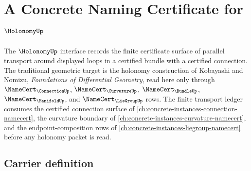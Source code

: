\chapter{A Concrete Naming Certificate for $\HolonomyUp$}
\label{ch:concrete-instances-holonomy-namecert}

The $\HolonomyUp$ interface records the finite certificate surface of parallel transport around displayed loops in a certified bundle with a certified connection. The traditional geometric target is the holonomy construction of Kobayashi and Nomizu, \emph{Foundations of Differential Geometry}, read here only through $\NameCert_{\ConnectionUp}$, $\NameCert_{\CurvatureUp}$, $\NameCert_{\BundleUp}$, $\NameCert_{\ManifoldUp}$, and $\NameCert_{\LieGroupUp}$ rows. The finite transport ledger consumes the certified connection surface of \autoref{ch:concrete-instances-connection-namecert}, the curvature boundary of \autoref{ch:concrete-instances-curvature-namecert}, and the endpoint-composition rows of \autoref{ch:concrete-instances-liegroup-namecert} before any holonomy packet is read.

\section{Carrier definition}
\label{sec:holonomy-carrier}

